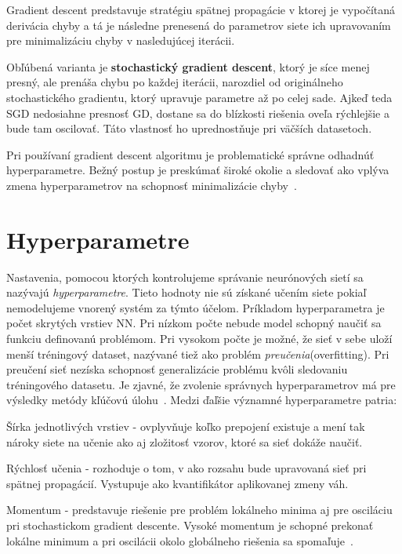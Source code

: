 Gradient descent predstavuje stratégiu spätnej propagácie v ktorej je vypočítaná derivácia chyby a tá je následne prenesená do parametrov siete ich upravovaním pre minimalizáciu chyby v nasledujúcej iterácii. 

Obľúbená varianta je \textbf{stochastický gradient descent}, ktorý je síce menej presný, ale prenáša chybu po každej iterácii, narozdiel od originálneho stochastického gradientu, ktorý upravuje parametre až po celej sade. Ajkeď teda SGD nedosiahne presnosť GD, dostane sa do blízkosti riešenia oveľa rýchlejšie a bude tam oscilovať. Táto vlastnosť ho uprednostňuje pri väčších datasetoch.

Pri používaní gradient descent algoritmu je problematické správne odhadnúť hyperparametre. Bežný postup je preskúmať široké okolie a sledovať ako vplýva zmena hyperparametrov na schopnosť minimalizácie chyby~\cite{zhang2004solving}.


\section{Hyperparametre}
\label{analyza_hyperparametre}

Nastavenia, pomocou ktorých kontrolujeme správanie neurónových sietí sa nazývajú \textit{hyperparametre}. Tieto hodnoty nie sú získané učením siete pokiaľ nemodelujeme vnorený systém za týmto účelom. Príkladom hyperparametra je počet skrytých vrstiev NN. Pri nízkom počte nebude model schopný naučiť sa funkciu definovanú problémom. Pri vysokom počte je možné, že sieť v sebe uloží menší tréningový dataset, nazývané tiež ako problém \textit{preučenia}(overfitting). Pri preučení sieť nezíska schopnosť generalizácie problému kvôli sledovaniu tréningového datasetu. Je zjavné, že zvolenie správnych hyperparametrov má pre výsledky metódy kľúčovú úlohu~\cite{Goodfellow-et-al-2016-Book}.
 Medzi ďaľšie významné hyperparametre patria:
\begin{my_itemize}
	\item {Šírka jednotlivých vrstiev} - ovplyvňuje koľko prepojení existuje a mení tak nároky siete na učenie ako aj zložitosť vzorov, ktoré sa sieť dokáže naučiť.
	\item {Rýchlosť učenia} - rozhoduje o tom, v ako rozsahu bude upravovaná sieť pri spätnej propagácií. Vystupuje ako kvantifikátor aplikovanej zmeny váh.
	\item {Momentum} - predstavuje riešenie pre problém lokálneho minima aj pre osciláciu pri stochastickom gradient descente. Vysoké momentum je schopné prekonať lokálne minimum a pri oscilácii okolo globálneho riešenia sa spomaľuje~\cite{attoh1999analysis}.
\end{my_itemize}

